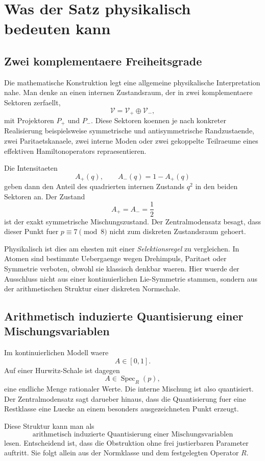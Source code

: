 \documentclass[11pt,a4paper]{article}
\theoremstyle{definition}
\newcommand{\Spec}{\operatorname{Spec}}
\begin{document}
\section{Was der Satz physikalisch bedeuten kann}
\subsection{Zwei komplementaere Freiheitsgrade}
Die mathematische Konstruktion legt eine allgemeine physikalische Interpretation nahe. Man denke an einen internen Zustandsraum, der in zwei komplementaere Sektoren zerfaellt,
\[
\mathcal V=\mathcal V_+\oplus\mathcal V_-,
\]
mit Projektoren $P_+$ und $P_-$. Diese Sektoren koennen je nach konkreter Realisierung beispielsweise symmetrische und antisymmetrische Randzustaende, zwei Paritaetskanaele, zwei interne Moden oder zwei gekoppelte Teilraeume eines effektiven Hamiltonoperators repraesentieren.

Die Intensitaeten
\[
A_+(q),\qquad A_-(q)=1-A_+(q)
\]
geben dann den Anteil des quadrierten internen Zustands $q^2$ in den beiden Sektoren an. Der Zustand
\[
A_+=A_-=\frac12
\]
ist der exakt symmetrische Mischungszustand. Der Zentralmodensatz besagt, dass dieser Punkt fuer $p\equiv7\pmod8$ nicht zum diskreten Zustandsraum gehoert.

Physikalisch ist dies am ehesten mit einer \emph{Selektionsregel} zu vergleichen. In Atomen sind bestimmte Uebergaenge wegen Drehimpuls, Paritaet oder Symmetrie verboten, obwohl sie klassisch denkbar waeren. Hier wuerde der Ausschluss nicht aus einer kontinuierlichen Lie-Symmetrie stammen, sondern aus der arithmetischen Struktur einer diskreten Normschale.

\subsection{Arithmetisch induzierte Quantisierung einer Mischungsvariablen}
Im kontinuierlichen Modell waere
\[
A\in[0,1].
\]
Auf einer Hurwitz-Schale ist dagegen
\[
A\in\Spec_R(p),
\]
eine endliche Menge rationaler Werte. Die interne Mischung ist also quantisiert. Der Zentralmodensatz sagt darueber hinaus, dass die Quantisierung fuer eine Restklasse eine Luecke an einem besonders ausgezeichneten Punkt erzeugt.

Diese Struktur kann man als
\[
\boxed{\text{arithmetisch induzierte Quantisierung einer Mischungsvariablen}}
\]
lesen. Entscheidend ist, dass die Obstruktion ohne frei justierbaren Parameter auftritt. Sie folgt allein aus der Normklasse und dem festgelegten Operator $R$.
\end{document}
